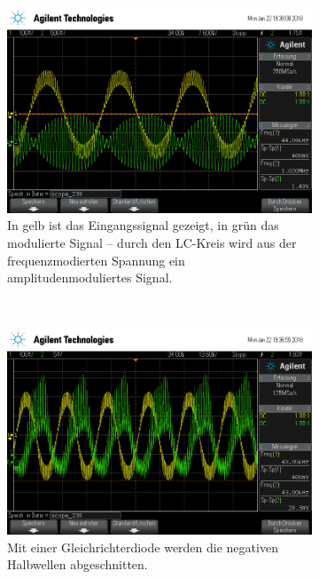 \begin{figure}[t!]
	\centering
	\begin{subfigure}[t]{0.5\textwidth}
		\centering
		\includegraphics[width=\textwidth]{img/h_scope_239.png}
		\caption{In gelb ist das Eingangssignal gezeigt, in grün das modulierte Signal -- durch den LC-Kreis wird aus der frequenzmodierten Spannung ein amplitudenmoduliertes Signal.}
		\label{amp}
	\end{subfigure}%
	~
	\begin{subfigure}[t]{0.5\textwidth}
		\centering
		\includegraphics[width=\textwidth]{img/h_scope_238.png}
		\caption{Mit einer Gleichrichterdiode werden die negativen Halbwellen abgeschnitten.}
		\label{De-FM}
	\end{subfigure}
	\\
	\begin{subfigure}[t]{0.5\textwidth}
		\centering

\end{subfigure}
\end{figure}
